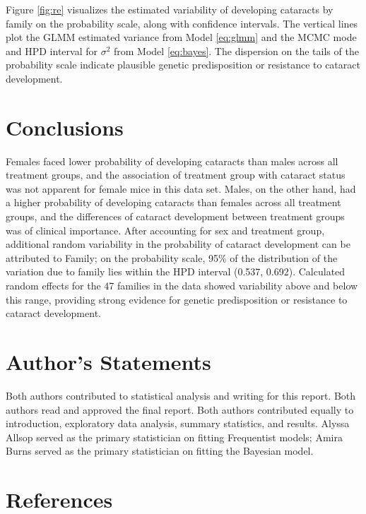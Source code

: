 \documentclass[12pt]{article}
\begin{document}
Figure \ref{fig:re} visualizes the estimated variability of developing cataracts by family on the probability scale, along with confidence intervals. The vertical lines plot the GLMM estimated variance from Model \eqref{eq:glmm} and the MCMC mode and HPD interval for \(\sigma^2\) from Model \eqref{eq:bayes}. The dispersion on the tails of the probability scale indicate plausible genetic predisposition or resistance to cataract development.

\section{Conclusions}
\label{sec:conc}

Females faced lower probability of developing cataracts than males across all treatment groups, and the association of treatment group with cataract status was not apparent for female mice in this data set. Males, on the other hand, had a higher probability of developing cataracts than females across all treatment groups, and the differences of cataract development between treatment groups was of clinical importance. After accounting for sex and treatment group, additional random variability in the probability of cataract development can be attributed to Family; on the probability scale, 95\% of the distribution of the variation due to family lies within the HPD interval (0.537, 0.692). Calculated random effects for the 47 families in the data showed variability above and below this range, providing strong evidence for genetic predisposition or resistance to cataract development.

\section{Author's Statements}
\label{sec:auth}

Both authors contributed to statistical analysis and writing for this report. Both authors read and approved the final report. Both authors contributed equally to introduction, exploratory data analysis, summary statistics, and results. Alyssa Allsop served as the primary statistician on fitting Frequentist models; Amira Burns served as the primary statistician on fitting the Bayesian model.

\newpage

\hypertarget{references}{%
\section{References}\label{references}}
\end{document}
